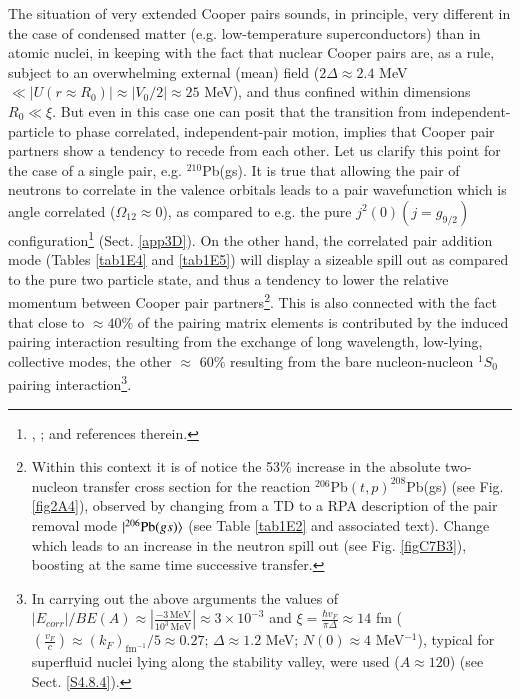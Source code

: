 The situation of very extended Cooper pairs sounds, in principle, very different in the case of condensed matter (e.g. low-temperature superconductors) than in atomic nuclei, in keeping with the fact that nuclear Cooper pairs are, as a rule, subject to an overwhelming external (mean) field ($2\Delta\approx2.4$ MeV $\ll |U(r\approx R_0)|\approx |V_0/2|\approx 25 $ MeV), and thus confined within dimensions $R_0\ll\xi$. But even in this case one can posit that  the transition from independent-particle to phase correlated, independent-pair motion, implies that Cooper pair partners show a tendency to recede from each other. Let us clarify this point for the case of a single pair, e.g. $^{210}$Pb(gs). It is true that allowing the pair of neutrons to correlate in the valence orbitals leads to a pair wavefunction which is angle correlated ($\Omega_{12}\approx 0$), as compared to e.g. the pure $j^2(0)(j=g_{9/2})$ configuration\footnote{\label{C4f17}\cite{Bertsch:67}, \cite{Ferreira:84,Matsuo:13};  \cite{Kubota:20} and references therein.} (Sect. \ref{app3D}). On the other hand, the correlated pair addition mode (Tables \ref{tab1E4} and \ref{tab1E5}) will display a sizeable spill out as compared to the pure two particle state, and thus a tendency to lower the relative momentum  between Cooper pair partners\footnote{Within this context it is of notice the 53\% increase in the absolute two-nucleon transfer cross section for the reaction $^{206}$Pb$(t,p)^{208}$Pb(gs) (see Fig. \ref{fig2A4}), observed by changing from a TD to a RPA description of the pair removal mode $|{^{206}\text{Pb}(gs)} \rangle$  (see Table \ref{tab1E2} and associated text). Change which leads to an increase in the neutron spill out (see Fig. \ref{figC7B3}), boosting at the same time successive transfer.}. This is also connected with the fact that close to $\approx 40$\% of the pairing matrix elements is contributed by the induced pairing interaction resulting from the exchange of long wavelength, low-lying, collective modes, the other $\approx$ 60\% resulting from the bare nucleon-nucleon $^1S_0$ pairing interaction\footnote{\label{f17C4} In carrying out the above arguments the values of $|E_{corr}|/BE(A)\approx \left|\frac{-3 \,\text{MeV}}{10^3\,\text{MeV}}\right|\approx 3\times10^{-3}$ and $\xi=\frac{\hbar v_F}{\pi\Delta}\approx 14$ fm ($(\frac{v_F}{c})\approx (k_F)_{\text{fm}^{-1}}/5\approx 0.27$; $\Delta\approx 1.2$ MeV; $N(0)\approx4$ MeV$^{-1}$), typical for superfluid nuclei lying along the stability valley, were used ($A\approx 120$) (see Sect. \ref{S4.8.4}).}. 



